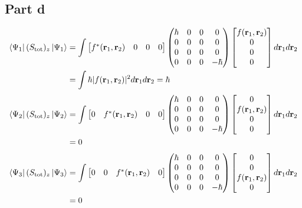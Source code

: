 \documentclass[12pt]{report}
\theoremstyle{custom}
\newcommand{\rb}{\bold{r}}
\begin{document}
\subsection*{Part d}
\begin{align*}
  \bra{\Psi_1}(S_{\text{tot}})_z \ket{\Psi_1} &= \int \begin{bmatrix} f^*(\rb_1,\rb_2) & 0 & 0 & 0 \end{bmatrix} \begin{pmatrix} \hbar & 0 & 0 & 0 \\ 0 & 0 & 0 & 0 \\ 0 & 0 & 0 & 0 \\ 0 & 0 & 0 & -\hbar \end{pmatrix}\begin{bmatrix} f(\rb_1,\rb_2) \\ 0 \\ 0 \\ 0 \end{bmatrix} d\rb_1 d\rb_2 \\
                                            &=  \int \hbar |f(\rb_1,\rb_2)|^2 d\rb_1 d\rb_2  = \hbar 
  \end{align*}
  \begin{align*}
  \bra{\Psi_2}(S_{\text{tot}})_z \ket{\Psi_2} &= \int \begin{bmatrix} 0 & f^*(\rb_1,\rb_2) & 0 & 0 \end{bmatrix}  \begin{pmatrix} \hbar & 0 & 0 & 0 \\ 0 & 0 & 0 & 0 \\ 0 & 0 & 0 & 0 \\ 0 & 0 & 0 & -\hbar \end{pmatrix} \begin{bmatrix} 0 \\ f(\rb_1,\rb_2)\\ 0 \\ 0 \end{bmatrix} d\rb_1 d\rb_2 \\
                                            &=  0
  \end{align*}
  \begin{align*}
    \bra{\Psi_3}(S_{\text{tot}})_z \ket{\Psi_3} &= \int \begin{bmatrix} 0 & 0 & f^*(\rb_1,\rb_2) & 0 \end{bmatrix}  \begin{pmatrix} \hbar & 0 & 0 & 0 \\ 0 & 0 & 0 & 0 \\ 0 & 0 & 0 & 0 \\ 0 & 0 & 0 & -\hbar \end{pmatrix}\begin{bmatrix} 0 \\ 0 \\ f(\rb_1,\rb_2)\\ 0 \end{bmatrix} d\rb_1 d\rb_2 \\
                                              &=  0
  \end{align*}
\end{document}
